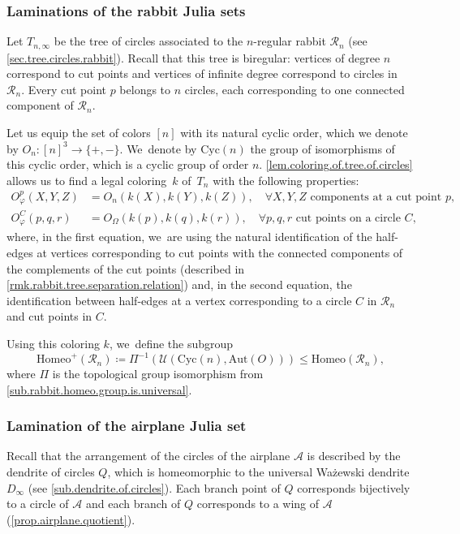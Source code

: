 \documentclass[JEP,XML,SOM,Unicode,NoFloatCountersInSection,published]{cedram}
\theoremstyle{plain}
\theoremstyle{definition}
\theoremstyle{remark}
\newcommand{\Aut}{\mathrm{Aut}}
\newcommand{\Cyc}{\mathrm{Cyc}}
\newcommand{\Homeo}{\mathrm{Homeo}}
\newcommand{\A}{\mathcal{A}}
\newcommand{\R}{\mathcal{R}}
\newcommand{\U}{\mathcal{U}}
\begin{document}
\subsubsection{Laminations of the rabbit Julia sets}

Let $T_{n,\infty}$ be the tree of circles associated to the $n$-regular rabbit $\R_n$ (see \cref{sec.tree.circles.rabbit}).
Recall that this tree is biregular:
vertices of degree $n$ correspond to cut points and vertices of infinite degree correspond to circles in $\R_n$.
Every cut point $p$ belongs to $n$ circles, each corresponding to one connected component of $\R_n$.

Let us equip the set of colors $[n]$ with its natural cyclic order, which we denote by $O_n \colon [n]^3 \to \{+,-\}$. We~denote by $\Cyc(n)$ the group of isomorphisms of this cyclic order, which is a cyclic group of order $n$.
\cref{lem.coloring.of.tree.of.circles} allows us to find a legal coloring~$k$ of~$T_n$ with the following properties:
\begin{align*}
 O_\varphi^p(X,Y,Z) &= O_n(k(X), k(Y), k(Z)),\quad \forall X, Y, Z \text{ components at a cut point } p, 
\\
 O_\varphi^C(p,q,r)&=O_\Omega(k(p),k(q),k(r)),\quad \forall p, q, r \text{ cut points on a circle } C, 
\end{align*}
where, in the first equation, we~are using the natural identification of the half-edges at vertices corresponding to cut points with the connected components of the complements of the cut points (described in \cref{rmk.rabbit.tree.separation.relation}) and, in the second equation, the identification between half-edges at a vertex corresponding to a circle $C$ in $\R_n$ and cut points in $C$.

Using this coloring $k$, we~define the subgroup
\[
 \Homeo^+(\R_n) \coloneqq \Pi^{-1} (\U(\Cyc(n),\Aut(O))) \leq \Homeo(\R_n), 
\]
where $\Pi$ is the topological group isomorphism from \cref{sub.rabbit.homeo.group.is.universal}.

\subsubsection{Lamination of the airplane Julia set}

Recall that the arrangement of the circles of the airplane $\A$ is described by the dendrite of circles $Q$, which is homeomorphic to the universal Ważewski dendrite $D_\infty$ (see \cref{sub.dendrite.of.circles}).
Each branch point of $Q$ corresponds bijectively to a circle of $\A$ and each branch of $Q$ corresponds to a wing of $\A$ (\cref{prop.airplane.quotient}).
\end{document}
